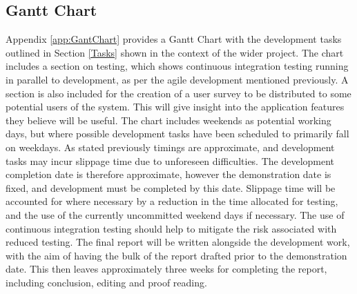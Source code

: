 \documentclass[titlepage,hidelinks,10pt]{article}
\begin{document}
\subsection{Gantt Chart}\label{GanttChart}
Appendix \ref{app:GantChart} provides a Gantt Chart with the development tasks outlined in Section \ref{Tasks} shown in the context of the wider project. The chart includes a section on testing, which shows continuous integration testing running in parallel to development, as per the agile development mentioned previously. A section is also included for the creation of a user survey to be distributed to some potential users of the system. This will give insight into the application features they believe will be useful. The chart includes weekends as potential working days, but where possible development tasks have been scheduled to primarily fall on weekdays. As stated previously timings are approximate, and development tasks may incur slippage time due to unforeseen difficulties. The development completion date is therefore approximate, however the demonstration date is fixed, and development must be completed by this date. Slippage time will be accounted for where necessary by a reduction in the time allocated for testing, and the use of the currently uncommitted weekend days if necessary. The use of continuous integration testing should help to mitigate the risk associated with reduced testing. The final report will be written alongside the development work, with the aim of having the bulk of the report drafted prior to the demonstration date. This then leaves approximately three weeks for completing the report, including conclusion, editing and proof reading.
\end{document}
